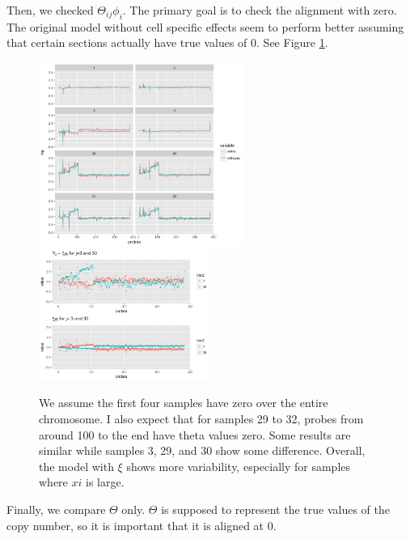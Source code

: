 \documentclass[11pt]{article}
\begin{document}
Then, we checked $\Theta_{ij}\phi_i$. The primary goal is to check the alignment with zero. The original model without cell specific effects seem to perform better assuming that certain sections actually have true values of 0. See Figure \ref{thetaphi}.
\begin{figure}[h]
\centering
\includegraphics[width=0.6\textwidth]{thetaphi.png}
\includegraphics[width=0.5\textwidth]{zoomedin.png}
\caption{We assume the first four samples have zero over the entire chromosome. I also expect that for samples 29 to 32, probes from around 100 to the end have theta values zero. Some results are similar while samples 3, 29, and 30 show some difference. Overall, the model with $\xi$ shows more variability, especially for samples where $xi$ is large.}
\label{thetaphi}
\end{figure}


\pagebreak

Finally, we compare $\Theta$ only. $\Theta$ is supposed to represent the true values of the copy number, so it is important that it is aligned at 0. 
\end{document}
